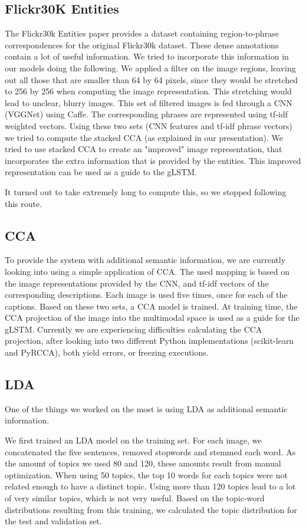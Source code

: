 \documentclass{article}
\begin{document}
\subsection{Flickr30K Entities}
The Flickr30k Entities paper \cite{Plummer2015} provides a dataset containing region-to-phrase correspondences for the original Flickr30k dataset. These dense annotations contain a lot of useful information. We tried to incorporate this information in our models doing the following. We applied a filter on the image regions, leaving out all those that are smaller than 64 by 64 pixels, since they would be stretched to 256 by 256 when computing the image representation. This stretching would lead to unclear, blurry images. This set of filtered images is fed through a CNN (VGGNet) using Caffe. The corresponding phrases are represented using tf-idf weighted vectors. Using these two sets (CNN features and tf-idf phrase vectors) we tried to compute the stacked CCA (as explained in our presentation). We tried to use stacked CCA to create an "improved" image representation, that incorporates the extra information that is provided by the entities. This improved representation can be used as a guide to the gLSTM.

It turned out to take extremely long to compute this, so we stopped following this route. 

\subsection{CCA}
To provide the system with additional semantic information, we are currently looking into using a simple application of CCA. The used mapping is based on the image representations provided by the CNN, and tf-idf vectors of the corresponding descriptions. Each image is used five times, once for each of the captions. Based on these two sets, a CCA model is trained. At training time, the CCA projection of the image into the multimodal space is used as a guide for the gLSTM. Currently we are experiencing difficulties calculating the CCA projection, after looking into two different Python implementations (scikit-learn and PyRCCA), both yield errors, or freezing executions. 

\subsection{LDA}
One of the things we worked on the most is using LDA as additional semantic information. 

We first trained an LDA model on the training set. For each image, we concatenated the five sentences, removed stopwords and stemmed each word. As the amount of topics we used 80 and 120, these amounts result from manual optimization. When using 50 topics, the top 10 words for each topics were not related enough to have a distinct topic. Using more than 120 topics lead to a lot of very similar topics, which is not very useful. Based on the topic-word distributions resulting from this training, we calculated the topic distribution for the test and validation set. 
\end{document}
